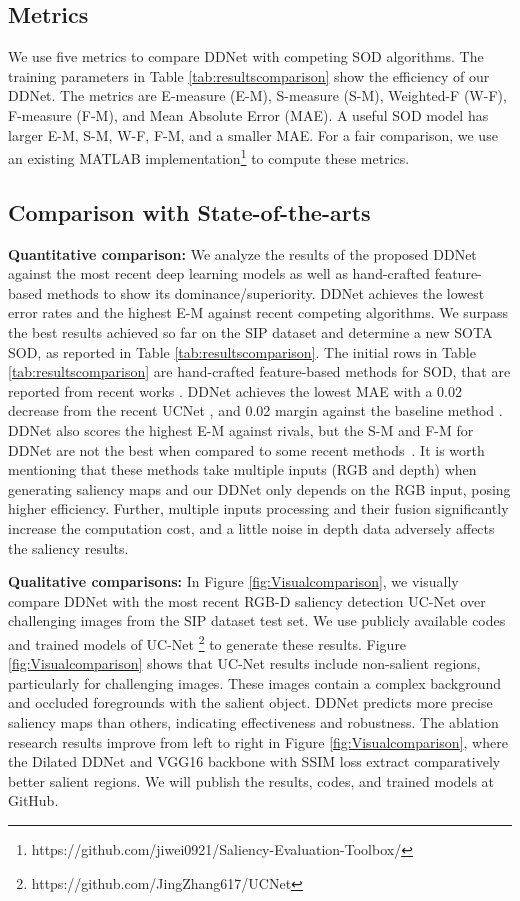 \documentclass{article}
\begin{document}
\subsection{Metrics}
We use five metrics to compare DDNet with competing SOD algorithms. The training parameters in Table \ref{tab:resultscomparison} show the efficiency of our DDNet. The metrics are E-measure (E-M), S-measure (S-M), Weighted-F (W-F), F-measure (F-M), and Mean Absolute Error (MAE). A useful SOD model has larger E-M, S-M, W-F, F-M, and a smaller MAE. For a fair comparison, we use an existing MATLAB implementation\footnote{https://github.com/jiwei0921/Saliency-Evaluation-Toolbox/} to compute these metrics.

\subsection{Comparison with State-of-the-arts} \label{ss:comparisons}
\textbf{Quantitative comparison:} We analyze the results of the proposed DDNet against the most recent deep learning models as well as hand-crafted feature-based methods to show its dominance/superiority. DDNet achieves the lowest error rates and the highest E-M against recent competing algorithms. We surpass the best results achieved so far on the SIP dataset and determine a new SOTA SOD, as reported in Table \ref{tab:resultscomparison}. The initial rows in Table \ref{tab:resultscomparison} are hand-crafted feature-based methods for SOD, that are reported from recent works \cite{zhai2020bifurcated,zhang2020uncertainty}. DDNet achieves the lowest MAE with a 0.02 decrease from the recent UCNet \cite{zhang2020uncertainty}, and 0.02 margin against the baseline method \cite{fan2020rethinking}. DDNet also scores the highest E-M against rivals, but the S-M and F-M for DDNet are not the best when compared to some recent methods~\cite{zhang2020uncertainty,fan2020bbs}. It is worth mentioning that these methods take multiple inputs (RGB and depth) when generating saliency maps and our DDNet only depends on the RGB input, posing higher efficiency. Further, multiple inputs processing and their fusion significantly increase the computation cost, and a little noise in depth data adversely affects the saliency results.

\vspace{2mm}
\noindent
\textbf{Qualitative comparisons:} In Figure \ref{fig:Visualcomparison}, we visually compare DDNet with the most recent RGB-D saliency detection UC-Net \cite{zhang2020uc} over challenging images from the SIP dataset test set. We use publicly available codes and trained models of UC-Net \footnote{https://github.com/JingZhang617/UCNet} to generate these results. Figure \ref{fig:Visualcomparison} shows that UC-Net results include non-salient regions, particularly for challenging images. These images contain a complex background and occluded foregrounds with the salient object. DDNet predicts more precise saliency maps than others, indicating effectiveness and robustness. The ablation research results improve from left to right in Figure \ref{fig:Visualcomparison}, where the Dilated DDNet and VGG16 backbone with SSIM loss extract comparatively better salient regions. We will publish the results, codes, and trained models at GitHub.
\end{document}
